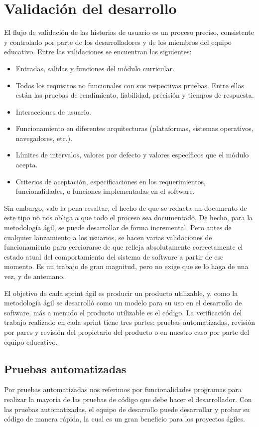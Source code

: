 
\chapter{Validación del desarrollo} \label{capitulo7}

El flujo de validación de las historias de usuario es un proceso preciso, consistente y controlado por parte de los desarrolladores y de los miembros del equipo educativo. Entre las validaciones se encuentran las siguientes:
\begin{itemize}
	\item Entradas, salidas y funciones del módulo curricular.
	\item Todos los requisitos no funcionales con sus respectivas pruebas. Entre ellas están las pruebas de rendimiento, fiabilidad, precisión y tiempos de respuesta.
	\item Interacciones de usuario.
	\item Funcionamiento en diferentes arquitecturas (plataformas, sistemas operativos, navegadores, etc.).
	\item Límites de intervalos, valores por defecto y valores específicos que el módulo acepta.
	\item Criterios de aceptación, especificaciones en los requerimientos, funcionalidades, o funciones implementadas en el software.
\end{itemize}

Sin embargo, vale la pena resaltar, el hecho de que se redacta un documento de este tipo no nos obliga a que todo el proceso sea documentado. De hecho, para la metodología ágil, se puede desarrollar de forma incremental. Pero antes de cualquier lanzamiento a los usuarios, se hacen varias validaciones de funcionamiento para cerciorarse de que refleja absolutamente correctamente el estado atual del comportamiento del sistema de software a partir de ese momento. Es un trabajo de gran magnitud, pero no exige que se lo haga de una vez, y de antemano.

El objetivo de cada sprint ágil es producir un producto utilizable, y, como la metodología ágil se desarrolló como un modelo para su uso en el desarrollo de software, más a menudo el producto utilizable es el código. La verificación del trabajo realizado en cada sprint tiene tres partes: pruebas automatizadas, revisión por pares y revisión del propietario del producto o en nuestro caso por parte del equipo educativo.

\section{Pruebas automatizadas}
Por pruebas automatizadas nos referimos por funcionalidades programas para realizar la mayoria de las pruebas de código que debe hacer el desarrollador. Con las pruebas automatizadas, el equipo de desarrollo puede desarrollar y probar su código de manera rápida, la cual es un gran beneficio para los proyectos ágiles.

